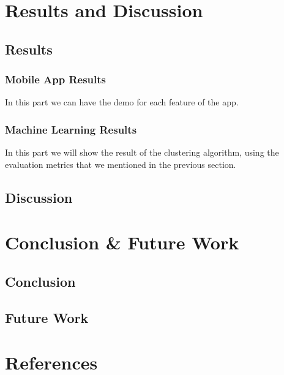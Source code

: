 \documentclass{article}
\begin{document}
\section{Results and Discussion}
\subsection{Results}

\subsubsection{Mobile App Results}
In this part we can have the demo for each feature of the app.

\subsubsection{Machine Learning Results}
In this part we will show the result of the clustering algorithm, using the evaluation 
metrics that we mentioned in the previous section.

\subsection{Discussion}

\section{Conclusion {\&} Future Work}

\subsection{Conclusion}
\subsection{Future Work}

\section{References}

\end{document}
